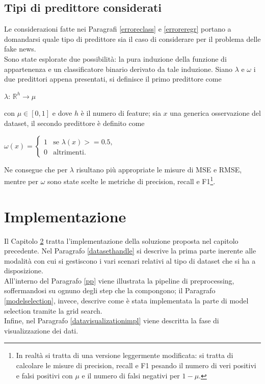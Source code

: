 \documentclass[12pt]{report}
\theoremstyle{definition}
\begin{document}
\section{Tipi di predittore considerati}\label{predictors}
Le considerazioni fatte nei Paragrafi \ref{erroreclass} e \ref{erroreregr} portano a domandarsi quale tipo di predittore sia il caso di considerare per il problema delle fake news.
\\
Sono state esplorate due possibilità: la pura induzione della funzione di appartenenza e un classificatore binario derivato da tale induzione.
Siano $\lambda$ e $\omega$ i due predittori appena presentati, si definisce il primo predittore come
\begin{center}
    $\lambda$: $\mathbb{R}^h \rightarrow \mu$
\end{center}
con $\mu \in [0,1]$ e dove $h$ è il numero di feature; sia $x$ una generica osservazione del dataset, il secondo predittore è definito come
\begin{center}
    $\omega(x) = \begin{cases} 1 & \mbox{se } \lambda(x) >= 0.5, \\ 0 & \mbox{altrimenti.} \end{cases}$
\end{center}
Ne consegue che per $\lambda$ risultano più appropriate le misure di MSE e RMSE, mentre per $\omega$ sono state scelte le metriche di precision, recall e F1\footnote{In realtà si tratta di una versione leggermente modificata: si tratta di calcolare le misure di precision, recall e F1 pesando il numero di veri positivi e falsi positivi con $\mu$ e il numero di falsi negativi per $1-\mu$.}.

\chapter{Implementazione}
\label{Capitolo 3}
\onehalfspacing
Il Capitolo \ref{Capitolo 3} tratta l'implementazione della soluzione proposta nel capitolo precedente. Nel Paragrafo \ref{datasethandle} si descrive la prima parte inerente alle modalità con cui si gestiscono i vari scenari relativi al tipo di dataset che si ha a disposizione.
\\
All'interno del Paragrafo \ref{pp} viene illustrata la pipeline di preprocessing, soffermandosi su ognuno degli step che la compongono; il Paragrafo \ref{modelselection}, invece, descrive come è stata implementata la parte di model selection tramite la grid search.
\\
Infine, nel Paragrafo \ref{datavisualizationimpl} viene descritta la fase di visualizzazione dei dati.
\end{document}
